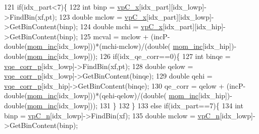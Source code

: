 \begin{DoxyCode}
121     \textcolor{keywordflow}{if}(idx\_part<7)\{
122       \textcolor{keywordtype}{int} binp     = \hyperlink{class_neutrino_flux_reweight_1_1_thin_target_m_c_a612fb4d230b0d597e299f67c50a71461}{vpC\_x}[idx\_part][idx\_lowp]->FindBin(xf,pt);
123       \textcolor{keywordtype}{double} mclow = \hyperlink{class_neutrino_flux_reweight_1_1_thin_target_m_c_a612fb4d230b0d597e299f67c50a71461}{vpC\_x}[idx\_part][idx\_lowp]->GetBinContent(binp);
124       \textcolor{keywordtype}{double} mchi  = \hyperlink{class_neutrino_flux_reweight_1_1_thin_target_m_c_a612fb4d230b0d597e299f67c50a71461}{vpC\_x}[idx\_part][idx\_hip]->GetBinContent(binp);
125       mcval = mclow + (incP-double(\hyperlink{class_neutrino_flux_reweight_1_1_thin_target_m_c_a039f1c0831ba09714b7ac1c9eca47a22}{mom\_inc}[idx\_lowp]))*(mchi-mclow)/(double(
      \hyperlink{class_neutrino_flux_reweight_1_1_thin_target_m_c_a039f1c0831ba09714b7ac1c9eca47a22}{mom\_inc}[idx\_hip])-double(\hyperlink{class_neutrino_flux_reweight_1_1_thin_target_m_c_a039f1c0831ba09714b7ac1c9eca47a22}{mom\_inc}[idx\_lowp]));
126       \textcolor{keywordflow}{if}(idx\_qe\_corr==0)\{
127         \textcolor{keywordtype}{int} binqe       = \hyperlink{class_neutrino_flux_reweight_1_1_thin_target_m_c_afb3e3731f237e92476381c3e860c4ac9}{vqe\_corr\_p}[idx\_lowp]->FindBin(xf,pt);
128         \textcolor{keywordtype}{double} qelow    = \hyperlink{class_neutrino_flux_reweight_1_1_thin_target_m_c_afb3e3731f237e92476381c3e860c4ac9}{vqe\_corr\_p}[idx\_lowp]->GetBinContent(binqe);
129         \textcolor{keywordtype}{double} qehi     = \hyperlink{class_neutrino_flux_reweight_1_1_thin_target_m_c_afb3e3731f237e92476381c3e860c4ac9}{vqe\_corr\_p}[idx\_hip]->GetBinContent(binqe);
130          qe\_corr  = qelow + (incP-double(\hyperlink{class_neutrino_flux_reweight_1_1_thin_target_m_c_a039f1c0831ba09714b7ac1c9eca47a22}{mom\_inc}[idx\_lowp]))*(qehi-qelow)/(double(
      \hyperlink{class_neutrino_flux_reweight_1_1_thin_target_m_c_a039f1c0831ba09714b7ac1c9eca47a22}{mom\_inc}[idx\_hip])-double(\hyperlink{class_neutrino_flux_reweight_1_1_thin_target_m_c_a039f1c0831ba09714b7ac1c9eca47a22}{mom\_inc}[idx\_lowp]));
131       \}
132     \}
133     \textcolor{keywordflow}{else} \textcolor{keywordflow}{if}(idx\_part==7)\{
134       \textcolor{keywordtype}{int} binp     = \hyperlink{class_neutrino_flux_reweight_1_1_thin_target_m_c_a929d19c1e5e17738376ecea2b91fe861}{vpC\_n}[idx\_lowp]->FindBin(xf);
135       \textcolor{keywordtype}{double} mclow = \hyperlink{class_neutrino_flux_reweight_1_1_thin_target_m_c_a929d19c1e5e17738376ecea2b91fe861}{vpC\_n}[idx\_lowp]->GetBinContent(binp);

\end{DoxyCode}
